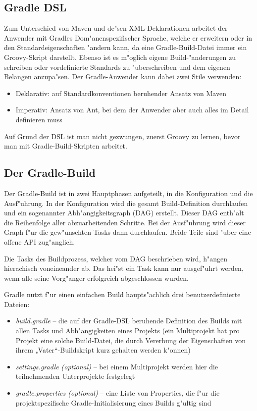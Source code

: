 \subsection{Gradle DSL}
Zum Unterschied von Maven und de"sen XML-Deklarationen arbeitet der Anwender mit Gradles Dom"anenspezifischer Sprache, welche er erweitern oder in den Standardeigenschaften "andern kann, da eine Gradle-Build-Datei immer ein Groovy-Skript darstellt.
Ebenso ist es m"oglich eigene Build-"anderungen zu schreiben oder vordefinierte Standards zu "uberschreiben und dem eigenen Belangen anzupa"sen.
Der Gradle-Anwender kann dabei zwei Stile verwenden:
\begin{itemize}
	\item Deklarativ: auf Standardkonventionen beruhender Ansatz von Maven 
	\item Imperativ: Ansatz von Ant, bei dem der Anwender aber auch alles im Detail definieren muss
\end{itemize}
Auf Grund der DSL ist man nicht gezwungen, zuerst Groovy zu lernen, bevor man mit Gradle-Build-Skripten arbeitet.

\subsection{Der Gradle-Build}
Der Gradle-Build ist in zwei Hauptphasen aufgeteilt, in die Konfiguration und die Ausf"uhrung.
In der Konfiguration wird die gesamt Build-Definition durchlaufen und ein sogenannter Abh"angigkeitsgraph (DAG) erstellt.
Dieser DAG enth"alt die Reihenfolge aller abzuarbeitenden Schritte. Bei der Ausf"uhrung wird dieser Graph f"ur die gew"unschten Tasks dann durchlaufen.
Beide Teile sind "uber eine offene API zug"anglich.

Die Tasks des Buildprozess, welcher vom DAG beschrieben wird, h"angen hierachisch voneineander ab. Das hei"st ein Task kann nur ausgef"uhrt werden, wenn alle seine Vorg"anger erfolgreich abgeschlossen wurden.

Gradle nutzt f"ur einen einfachen Build haupts"achlich drei benutzerdefinierte Dateien:
\begin{itemize}
	\item \textit{build.gradle} – die auf der Gradle-DSL beruhende Definition des Builds mit allen Tasks und Abh"angigkeiten eines Projekts (ein Multiprojekt hat pro Projekt eine solche Build-Datei, die durch Vererbung der Eigenschaften von ihrem „Vater“-Buildskript kurz gehalten werden k"onnen)
    \item \textit{settings.gradle (optional)} – bei einem Multiprojekt werden hier die teilnehmenden Unterprojekte festgelegt
    \item \textit{gradle.properties (optional)} – eine Liste von Properties, die f"ur die projektspezifische Gradle-Initialisierung eines Builds g"ultig sind
\end{itemize}
